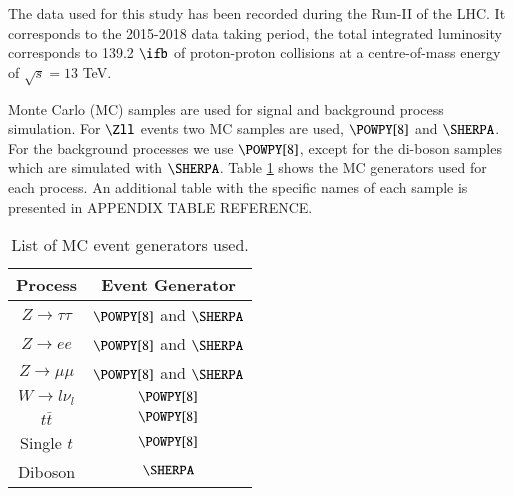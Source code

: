 The data used for this study has been recorded during the Run-II of the LHC. It corresponds to the 2015-2018 data taking period, the total integrated luminosity corresponds to 139.2 $\ifb	$ of proton-proton collisions at a centre-of-mass energy of $\sqrt{s}=13$ TeV.

Monte Carlo (MC) samples are used for signal and background process simulation. For $\Zll$ events two MC samples are used, $\POWPY[8]$ and $\SHERPA$. For the background processes we use $\POWPY[8]$, except for the di-boson samples which are simulated with $\SHERPA$. Table \ref{Table3} shows the MC generators used for each process. An additional table with the specific names of each sample is presented in APPENDIX TABLE REFERENCE.

\begin{table}[htbp]
	\centering
	\begin{tabular}{cc}
		\hline
		\multicolumn{1}{|c|}{Process}  & \multicolumn{1}{c|}{Event Generator} \\ \hline
		$Z\to\tau\tau$                 & $\POWPY[8]$ and $\SHERPA$           \\
		$Z\to ee$                      & $\POWPY[8]$ and $\SHERPA$           \\
		$Z\to\mu\mu$                   & $\POWPY[8]$ and $\SHERPA$           \\
		$W\to l\nu_l$				   & $\POWPY[8]$                       \\
		$t\bar{t}$                     & $\POWPY[8]$                       \\
		Single $t$                     & $\POWPY[8]$                       \\
		Diboson                        & $\SHERPA$                       \\ \hline
	\end{tabular}
	\caption{List of MC event generators used.}
	\label{Table3}
\end{table}